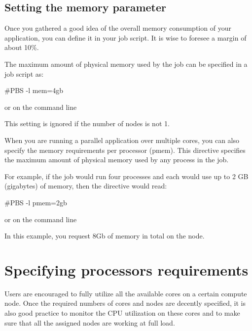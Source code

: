 \begin{prompt}
\end{prompt}

\subsection{Setting the memory parameter}

Once you gathered a good idea of the overall memory consumption of your
application, you can define it in your job script.  It is wise to foresee a
margin of about 10\%.


The maximum amount of physical memory used by the job can be specified in a job
script as:

\begin{prompt}
#PBS -l mem=4gb
\end{prompt}

or on the command line
\begin{prompt}
\end{prompt}

This setting is ignored if the number of nodes is not 1.


When you are running a parallel application over multiple cores, you can also
specify the memory requirements per processor (pmem). This directive specifies
the maximum amount of physical memory used by any process in the job.

For example, if the job would run four processes and each would use up to 2 GB
(gigabytes) of memory, then the directive would read:

\begin{prompt}
#PBS -l pmem=2gb
\end{prompt}

or on the command line
\begin{prompt}
\end{prompt}

In this example, you request 8Gb of memory in total on the node.

\section{Specifying processors requirements}

Users are encouraged to fully utilize all the available cores on a certain
compute node. Once the required numbers of cores and nodes are decently
specified, it is also good practice to monitor the CPU utilization on these
cores and to make sure that all the assigned nodes are working at full load.

